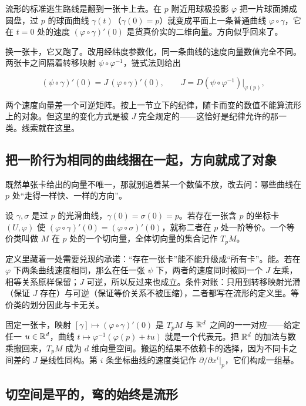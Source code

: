 流形的标准逃生路线是翻到一张卡上去。在 \(p\) 附近用球极投影 \(\varphi\) 把一片球面摊成圆盘，过 \(p\) 的球面曲线 \(\gamma(t)\)（\(\gamma(0)=p\)）就变成平面上一条普通曲线 \(\varphi\circ\gamma\)，它在 \(t=0\) 处的速度 \((\varphi\circ\gamma)'(0)\) 是货真价实的二维向量。方向似乎回来了。

换一张卡，它又跑了。改用经纬度参数化，同一条曲线的速度向量数值完全不同。两张卡之间隔着转移映射 \(\psi\circ\varphi^{-1}\)，链式法则给出

\[
(\psi\circ\gamma)'(0)=J\,(\varphi\circ\gamma)'(0),
\qquad J=D(\psi\circ\varphi^{-1})\big|_{\varphi(p)},
\]

两个速度向量差一个可逆矩阵。按上一节立下的纪律，随卡而变的数值不能算流形上的对象。但这里的变化方式是被 \(J\) 完全规定的——这恰好是纪律允许的那一类。线索就在这里。

\subsection{把一阶行为相同的曲线捆在一起，方向就成了对象}

既然单张卡给出的向量不唯一，那就别追着某一个数值不放，改去问：哪些曲线在 \(p\) 处``走得一样快、一样的方向''。

\begin{definition}[切向量]
设 \(\gamma,\sigma\) 是过 \(p\) 的光滑曲线，\(\gamma(0)=\sigma(0)=p\)。若存在一张含 \(p\) 的坐标卡 \((U,\varphi)\) 使 \((\varphi\circ\gamma)'(0)=(\varphi\circ\sigma)'(0)\)，就称二者在 \(p\) 处一阶等价。一个等价类叫做 \(M\) 在 \(p\) 处的一个切向量，全体切向量的集合记作 \(T_{p}M\)。
\end{definition}

定义里藏着一处需要兑现的承诺：``存在一张卡''能不能升级成``所有卡''。能。若在 \(\varphi\) 下两条曲线速度相同，那么在任一张 \(\psi\) 下，两者的速度同时被同一个 \(J\) 左乘，相等关系原样保留；\(J\) 可逆，所以反过来也成立。条件对账：只用到转移映射光滑（保证 \(J\) 存在）与可逆（保证等价关系不被压缩），二者都写在流形的定义里。等价类的划分因此与卡无关。

固定一张卡，映射 \([\gamma]\mapsto(\varphi\circ\gamma)'(0)\) 是 \(T_{p}M\) 与 \(\mathbb{R}^{d}\) 之间的一一对应——给定任一 \(u\in\mathbb{R}^{d}\)，曲线 \(t\mapsto\varphi^{-1}(\varphi(p)+tu)\) 就是一个代表元。把 \(\mathbb{R}^{d}\) 的加法与数乘搬回来，\(T_{p}M\) 成为 \(d\) 维向量空间。搬运的结果不依赖卡的选择，因为不同卡之间差的 \(J\) 是线性同构。第 \(i\) 条坐标曲线的速度类记作 \(\partial/\partial x^{i}|_{p}\)，它们构成一组基。

\subsection{切空间是平的，弯的始终是流形}


